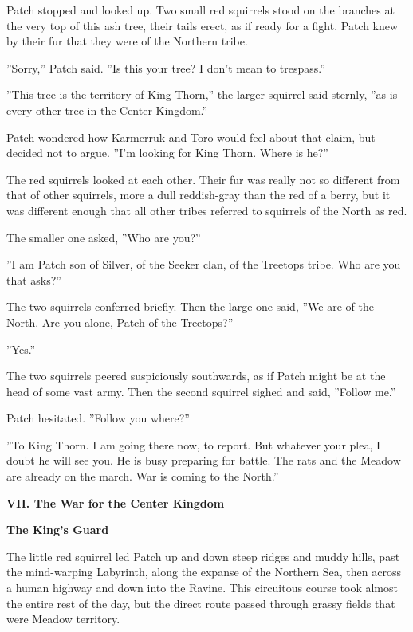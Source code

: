 \documentclass[11pt]{article}
\begin{document}
 Patch stopped and looked up. Two small red squirrels stood on the branches at the very top of this ash tree, their tails erect, as if ready for a fight. Patch knew by their fur that they were of the Northern tribe.\par
 ''Sorry,'' Patch said. ''Is this your tree? I don't mean to trespass.''\par
 ''This tree is the territory of King Thorn,'' the larger squirrel said sternly, ''as is every other tree in the Center Kingdom.''\par
 Patch wondered how Karmerruk and Toro would feel about that claim, but decided not to argue. ''I'm looking for King Thorn. Where is he?''\par
 The red squirrels looked at each other. Their fur was really not so different from that of other squirrels, more a dull reddish-gray than the red of a berry, but it was different enough that all other tribes referred to squirrels of the North as red.\par
The smaller one asked, ''Who are you?''\par
 ''I am Patch son of Silver, of the Seeker clan, of the Treetops tribe. Who are you that asks?''\par
 The two squirrels conferred briefly. Then the large one said, ''We are of the North. Are you alone, Patch of the Treetops?''\par
 ''Yes.''\par
 The two squirrels peered suspiciously southwards, as if Patch might be at the head of some vast army. Then the second squirrel sighed and said, ''Follow me.''\par
 Patch hesitated. ''Follow you where?''\par
 ''To King Thorn. I am going there now, to report. But whatever your plea, I doubt he will see you. He is busy preparing for battle. The rats and the Meadow are already on the march. War is coming to the North.''\par
\par
{\bf VII. The War for the Center Kingdom\par

}\par
{\bf The King's Guard\par
}\par
 The little red squirrel led Patch up and down steep ridges and muddy hills, past the mind-warping Labyrinth, along the expanse of the Northern Sea, then across a human highway and down into the Ravine. This circuitous course took almost the entire rest of the day, but the direct route passed through grassy fields that were Meadow territory.\par
\end{document}
